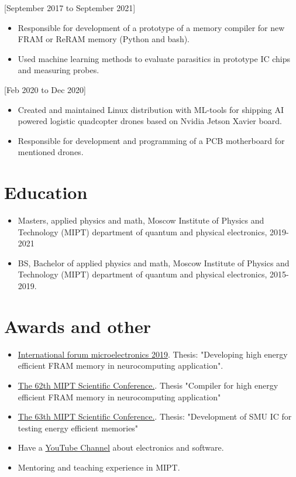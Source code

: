 \documentclass{article}
\begin{document}
[September 2017 to September 2021]
\begin{itemize}
\item Responsible for development of a prototype of a memory  compiler for new FRAM or ReRAM memory (Python and bash).
\item Used machine learning methods to evaluate parasitics in prototype IC chips and measuring probes.
\end{itemize}

[Feb 2020 to Dec 2020]
\begin{itemize}
\item Created and maintained Linux distribution with ML-tools for shipping AI powered logistic quadcopter drones based on Nvidia Jetson Xavier board.
\item Responsible for development and programming of a PCB motherboard for mentioned drones.
\end{itemize}

\section{Education}
 
\begin{itemize}
\item Masters, applied physics and math, Moscow Institute of Physics and Technology (MIPT) department of quantum and physical electronics, 2019-2021
\item BS, Bachelor of applied physics and math, Moscow Institute of Physics and Technology (MIPT) department of quantum and physical electronics, 2015-2019.
\end{itemize}
 
\section{Awards and other}
 
\begin{itemize}
\item \href{https://microelectronica.pro/}{International forum microelectronics 2019}. Thesis: "Developing high energy efficient FRAM memory in neurocomputing application".
\item \href{https://conf62.mipt.ru/}{The 62th MIPT Scientific Conference.}. Thesis "Compiler for high energy efficient FRAM memory in neurocomputing application"
\item \href{https://mipt.ru/science/5top100/education/courseproposal/%D0%A4%D0%AD%D0%A4%D0%9C.pdf}{The 63th MIPT Scientific Conference.}. Thesis: "Development of SMU IC for testing energy efficient memories"
\item Have a \href{https://www.youtube.com/channel/UCAjmXQnYQjWoVHx6NIo24CQ}{YouTube Channel} about electronics and software.
\item Mentoring and teaching experience in MIPT.
\end{itemize}
 
\end{document}
